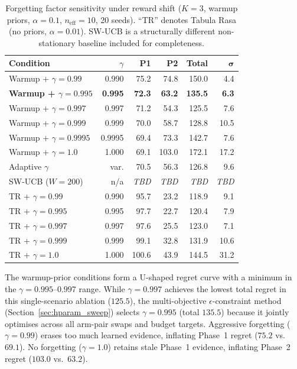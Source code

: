 \begin{table}[h]
\centering
\small
\caption{Forgetting factor sensitivity under reward shift
($K{=}3$, warmup priors, $\alpha{=}0.1$, $n_\mathrm{eff}{=}10$,
20 seeds).  ``TR'' denotes Tabula Rasa (no priors,
$\alpha{=}0.01$).  SW-UCB is a structurally different
non-stationary baseline included for completeness.}
\label{tab:gamma_ablation}
\begin{tabular}{@{}lrrrrr@{}}
\toprule
\textbf{Condition} & \textbf{$\gamma$} &
    \textbf{P1} & \textbf{P2} & \textbf{Total} & $\boldsymbol{\sigma}$ \\
\midrule
Warmup + $\gamma{=}0.99$   & 0.990 & 75.2 & 74.8 & 150.0 &  4.4 \\
\textbf{Warmup + $\gamma{=}0.995$}  & \textbf{0.995} & \textbf{72.3} & \textbf{63.2} & \textbf{135.5} &  \textbf{6.3} \\
Warmup + $\gamma{=}0.997$  & 0.997 & 71.2 & 54.3 & 125.5 &  7.6 \\
Warmup + $\gamma{=}0.999$  & 0.999 & 70.0 & 58.7 & 128.8 & 10.5 \\
Warmup + $\gamma{=}0.9995$ & 0.9995& 69.4 & 73.3 & 142.7 &  7.6 \\
Warmup + $\gamma{=}1.0$    & 1.000 & 69.1 & 103.0& 172.1 & 17.2 \\
Adaptive $\gamma$           & var.  & 70.5 & 56.3 & 126.8 &  9.6 \\
\midrule
SW-UCB ($W{=}200$)          & n/a   & \emph{TBD} & \emph{TBD} & \emph{TBD} & \emph{TBD} \\
\midrule
TR + $\gamma{=}0.99$       & 0.990 & 95.7 & 23.2 & 118.9 &  9.1 \\
TR + $\gamma{=}0.995$      & 0.995 & 97.7 & 22.7 & 120.4 &  7.9 \\
TR + $\gamma{=}0.997$      & 0.997 & 97.6 & 25.5 & 123.0 &  7.1 \\
TR + $\gamma{=}0.999$      & 0.999 & 99.1 & 32.8 & 131.9 & 10.6 \\
TR + $\gamma{=}1.0$        & 1.000 &100.6 & 43.9 & 144.5 & 31.2 \\
\bottomrule
\end{tabular}
\end{table}

\noindent
The warmup-prior conditions form a U-shaped regret curve with
a minimum in the $\gamma{=}0.995$--$0.997$ range.
While $\gamma{=}0.997$ achieves the lowest total regret in this
single-scenario ablation ($125.5$), the multi-objective
$\epsilon$-constraint method (Section~\ref{sec:hparam_sweep})
selects $\gamma{=}0.995$ (total $135.5$) because it jointly
optimises across all arm-pair swaps and budget targets.
Aggressive forgetting ($\gamma{=}0.99$) erases too much learned
evidence, inflating Phase~1 regret ($75.2$ vs.\ $69.1$).
No forgetting ($\gamma{=}1.0$) retains stale Phase~1 evidence,
inflating Phase~2 regret ($103.0$ vs.\ $63.2$).


